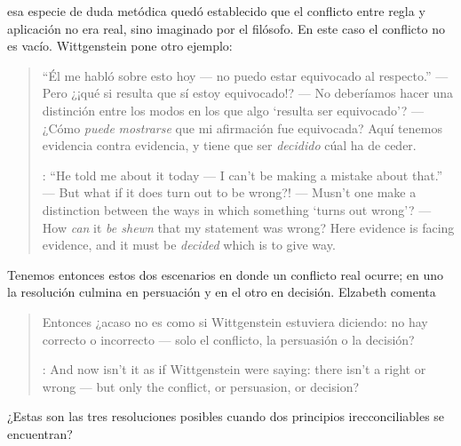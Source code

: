 esa especie de duda metódica quedó establecido que el conflicto entre regla y aplicación no era real, sino imaginado por el filósofo. En este caso el conflicto no es vacío. Wittgenstein pone otro ejemplo: \blockquote[{\cite[\S641]{wittgenstein1969oncert}}: ``He told me about it today --- I can't be making a mistake about that.'' --- But what if it does turn out to be wrong?! --- Musn't one make a distinction between the ways in which something `turns out wrong'? --- How \emph{can} it \emph{be shewn} that my statement was wrong? Here evidence is facing evidence, and it must be \emph{decided} which is to give way.]{``Él me habló sobre esto hoy --- no puedo estar equivocado al respecto.'' --- Pero ¿¡qué si resulta que sí estoy equivocado!? --- No deberíamos hacer una distinción entre los modos en los que algo `resulta ser equivocado'? --- ¿Cómo \emph{puede} \emph{mostrarse} que mi afirmación fue equivocada? Aquí tenemos evidencia contra evidencia, y tiene que ser \emph{decidido} cúal ha de ceder.}

    Tenemos entonces estos dos escenarios en donde un conflicto real ocurre; en uno la resolución culmina en persuación y en el otro en decisión. Elzabeth comenta \blockquote[{\cite{anscombe1981parmenides:qli}}: And now isn't it as if Wittgenstein were saying: there isn't a right or wrong --- but only the conflict, or persuasion, or decision?]{Entonces ¿acaso no es como si Wittgenstein estuviera diciendo: no hay correcto o incorrecto --- solo el conflicto, la persuasión o la decisión?} ¿Estas son las tres resoluciones posibles cuando dos principios irecconciliables se encuentran?

